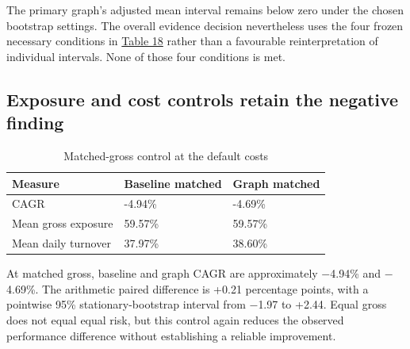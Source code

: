 \documentclass[12pt,a4paper,oneside]{article}
\begin{document}
The primary graph's adjusted mean interval remains below zero under the chosen bootstrap settings. The overall evidence decision nevertheless uses the four frozen necessary conditions in \hyperref[tab:18]{Table 18} rather than a favourable reinterpretation of individual intervals. None of those four conditions is met.


\subsection{Exposure and cost controls retain the negative finding}

\begingroup
\setcounter{table}{20}
\fontsize{10}{12.5}\selectfont
\renewcommand{\arraystretch}{1.12}
\begin{table}[!htbp]
\centering
{}\fontsize{10}{12.5}\selectfont
\begin{tabular}{P{0.460000\dimexpr{}\tabcolsep\relax}Q{0.270000\dimexpr{}\tabcolsep\relax}Q{0.270000\dimexpr{}\tabcolsep\relax}}
\toprule
{} \textbf{Measure} & \textbf{Baseline matched} & \textbf{Graph matched} \\ \midrule
CAGR & -4.94\% & -4.69\% \\
\midrule[0.2pt]
Mean gross exposure & 59.57\% & 59.57\% \\
\midrule[0.2pt]
Mean daily turnover & 37.97\% & 38.60\% \\
\bottomrule
\end{tabular}
\caption{Matched-gross control at the default costs}\label{tab:21}
\end{table}
\endgroup

At matched gross, baseline and graph CAGR are approximately \( - \)4.94\% and \( - \)4.69\%. The arithmetic paired difference is +0.21 percentage points, with a pointwise 95\% stationary-bootstrap interval from \( - \)1.97 to +2.44. Equal gross does not equal equal risk, but this control again reduces the observed performance difference without establishing a reliable improvement.
\end{document}
